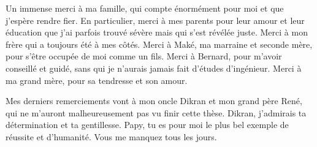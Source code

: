 Un immense merci à ma famille, qui compte énormément pour moi et que j'espère
rendre fier. En particulier, merci à mes parents pour leur amour et leur
éducation que j'ai parfois trouvé sévère mais qui s'est révélée juste. Merci à
mon frère qui a toujours été à mes côtés. Merci à Maké, ma marraine et seconde
mère, pour s'être occupée de moi comme un fils. Merci à Bernard, pour m'avoir
conseillé et guidé, sans qui je n'aurais jamais fait d'études d'ingénieur. Merci
à ma grand mère, pour sa tendresse et son amour.

Mes derniers remerciements vont à mon oncle Dikran et mon grand père René, qui
ne m'auront malheureusement pas vu finir cette thèse. Dikran, j'admirais ta
détermination et ta gentillesse. Papy, tu es pour moi le plus bel exemple de
réussite et d'humanité. Vous me manquez tous les jours.

